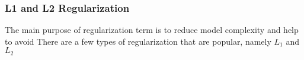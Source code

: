 \subsubsection{L1 and L2 Regularization}

The main purpose of regularization term is to reduce model complexity and help to avoid There are a few types of regularization that are popular, namely $L_1$ and $L_2$